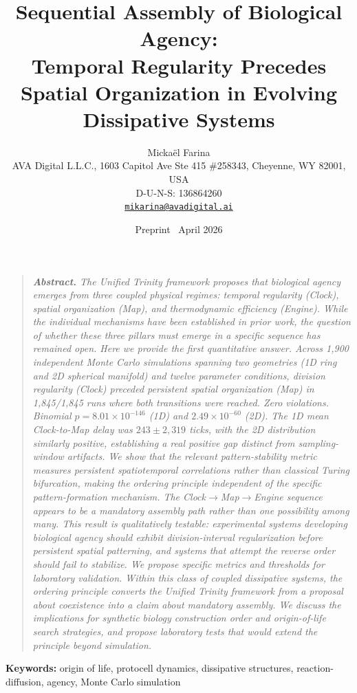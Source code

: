 \documentclass[11pt,letterpaper]{article}
\title{\textbf{Sequential Assembly of Biological Agency:\\
Temporal Regularity Precedes Spatial Organization in Evolving Dissipative Systems}}
\author{%
  Micka\"el Farina\\
  \small AVA Digital L.L.C., 1603 Capitol Ave Ste 415 \#258343, Cheyenne, WY 82001, USA\\
  \small D-U-N-S: 136864260\\
  \small \href{mailto:mikarina@avadigital.ai}{\texttt{mikarina@avadigital.ai}}
}
\date{\small Preprint \textperiodcentered\ April 2026}
\begin{document}
\maketitle
\thispagestyle{fancy}

\begin{quote}
\small\itshape
\textbf{\upshape Abstract.} The Unified Trinity framework \citep{farina2025trinity} proposes that biological agency emerges from three coupled physical regimes: temporal regularity (Clock), spatial organization (Map), and thermodynamic efficiency (Engine). While the individual mechanisms have been established in prior work, the question of whether these three pillars must emerge in a specific sequence has remained open. Here we provide the first quantitative answer. Across 1{,}900 independent Monte Carlo simulations spanning two geometries (1D ring and 2D spherical manifold) and twelve parameter conditions, division regularity (Clock) preceded persistent spatial organization (Map) in 1{,}845/1{,}845 runs where both transitions were reached. Zero violations. Binomial $p = 8.01 \times 10^{-146}$ (1D) and $2.49 \times 10^{-60}$ (2D). The 1D mean Clock-to-Map delay was $243 \pm 2{,}319$ ticks, with the 2D distribution similarly positive, establishing a real positive gap distinct from sampling-window artifacts. We show that the relevant pattern-stability metric measures persistent spatiotemporal correlations rather than classical Turing bifurcation, making the ordering principle independent of the specific pattern-formation mechanism. The Clock$\to$Map$\to$Engine sequence appears to be a mandatory assembly path rather than one possibility among many. This result is qualitatively testable: experimental systems developing biological agency should exhibit division-interval regularization before persistent spatial patterning, and systems that attempt the reverse order should fail to stabilize. We propose specific metrics and thresholds for laboratory validation. Within this class of coupled dissipative systems, the ordering principle converts the Unified Trinity framework from a proposal about coexistence into a claim about mandatory assembly. We discuss the implications for synthetic biology construction order and origin-of-life search strategies, and propose laboratory tests that would extend the principle beyond simulation.
\end{quote}

\noindent\textbf{Keywords:} origin of life, protocell dynamics, dissipative structures, reaction-diffusion, agency, Monte Carlo simulation
\end{document}
